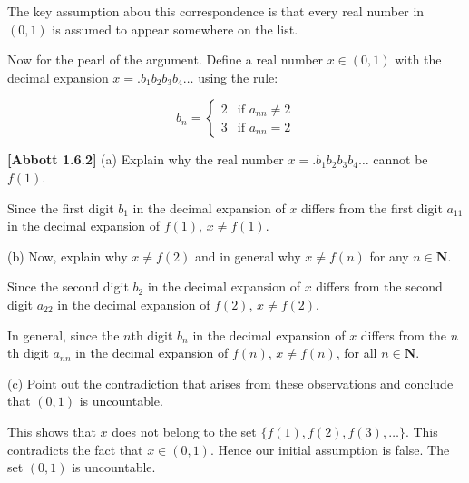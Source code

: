 \documentclass[10pt]{article}
\begin{document}
The key assumption abou this correspondence is that every real number in $\displaystyle ( 0,1)$ is assumed to appear somewhere on the list.



Now for the pearl of the argument. Define a real number $\displaystyle x\in ( 0,1)$ with the decimal expansion $\displaystyle x=.b_{1} b_{2} b_{3} b_{4} \dotsc $ using the rule:




\begin{equation*}
b_{n} =\begin{cases}
2 & \text{if } a_{nn} \neq 2\\
3 & \text{if } a_{nn} =2
\end{cases}
\end{equation*}


\textbf{[Abbott 1.6.2]} (a) Explain why the real number $\displaystyle x=.b_{1} b_{2} b_{3} b_{4} \dotsc $ cannot be $\displaystyle f( 1)$.



Since the first digit $\displaystyle b_{1}$ in the decimal expansion of $\displaystyle x$ differs from the first digit $\displaystyle a_{11}$ in the decimal expansion of $\displaystyle f( 1)$, $\displaystyle x\neq f( 1)$.



(b) Now, explain why $\displaystyle x\neq f( 2)$ and in general why $\displaystyle x\neq f( n)$ for any $\displaystyle n\in \mathbf{N}$.



Since the second digit $\displaystyle b_{2}$ in the decimal expansion of $\displaystyle x$ differs from the second digit $\displaystyle a_{22}$ in the decimal expansion of $\displaystyle f( 2)$, $\displaystyle x\neq f( 2)$.



In general, since the $\displaystyle n$th digit $\displaystyle b_{n}$ in the decimal expansion of $\displaystyle x$ differs from the $\displaystyle n$th digit $\displaystyle a_{nn}$ in the decimal expansion of $\displaystyle f( n)$, $\displaystyle x\neq f( n)$, for all $\displaystyle n\in \mathbf{N}$.



(c) Point out the contradiction that arises from these observations and conclude that $\displaystyle ( 0,1)$ is uncountable.



This shows that $\displaystyle x$ does not belong to the set $\displaystyle \{f( 1) ,f( 2) ,f( 3) ,\dotsc \}$. This contradicts the fact that $\displaystyle x\in ( 0,1)$. Hence our initial assumption is false. The set $\displaystyle ( 0,1)$ is uncountable.
\end{document}
